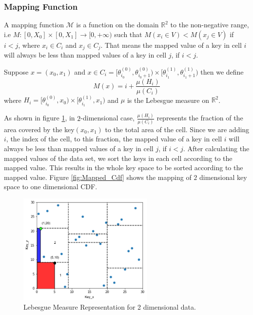 \subsubsection{Mapping Function}
\label{sssec:Mapping_Function}
A mapping function $\mathcal{M}$ is a function on the domain $\mathbb{R}^{2}$ to the non-negative range, i.e $M:[0,X_{0}]\times[0,X_{1}]\to [0,+\infty)$ such that
    $ M(x_{i} \in V) <  M(x_{j} \in V)$ if $i<j$, where $x_{i} \in C_{i}$ and $x_{j} \in C_{j}$. That means the mapped value of a key in cell $i$ will always be less than mapped values of a key in cell $j$, if $i <j$. 
    
Suppose $x = (x_{0}, x_{1})$ and $x \in C_{i} = [\theta^{(0)}_{i_0},\theta^{(0)}_{i_0+1}) \times [\theta^{(1)}_{i_1},\theta^{(1)}_{i_1+1}) $ then we define 
$$M(x) = i+ \frac {\mu(H_{i})}{\mu(C_{i})} $$ where $H_{i} = [\theta^{(0)}_{i_0},x_{0}) \times [\theta^{(1)}_{i_1},x_{1}) $ and $\mu$ is the Lebesgue measure on $\mathbb{R}^2$.

As shown in figure \ref{fig:Lebesgue_Measure}, in $2$-dimensional case, $\frac {\mu(H_{i})}{\mu(C_{i})}$ represents the fraction of the area covered by the key$(x_{0}, x_{1})$ to the total area of the cell. Since we are adding $i$, the index of the cell, to this fraction, the mapped value of a key in cell $i$ will always be less than mapped values of a key in cell $j$, if $i<j$. After calculating the mapped values of the data set, we sort the keys in each cell according to the mapped value. This results in the whole key space to be sorted according to the mapped value. Figure \ref{fig:Mapped_Cdf} shows the mapping of $2$ dimensional key space to one dimensional CDF.

\begin{figure}[t]
    \centering
    \includegraphics[width=0.6\textwidth]{graphs/implementation/Lebesgue_Measure.pdf}
    \caption{Lebesgue Measure Representation for 2 dimensional data.}
    \label{fig:Lebesgue_Measure}
\end{figure}

